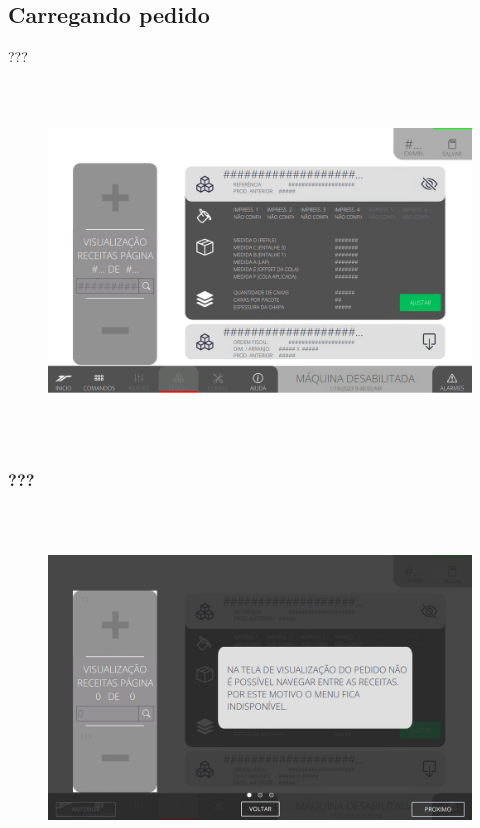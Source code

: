 \newpage
\thispagestyle{fancy}
\vspace*{\fill}
\subsection{Carregando pedido}
 ???
\begin{figure}[h]
  \centering
  \includegraphics[width=576px,height=360px]{src/imagesFlexo/10-orders/01-visualization/e-Tela-Principal-2.png}
   \label{}
\end{figure}

\newpage
\thispagestyle{fancy}
\vspace*{\fill}
\subsubsection{\small{???}}
\begin{figure}[h]
  \centering
  \includegraphics[width=576px,height=360px]{src/imagesFlexo/10-orders/01-visualization/e-4.png}
   \label{}
\end{figure}
\vspace*{\fill}

